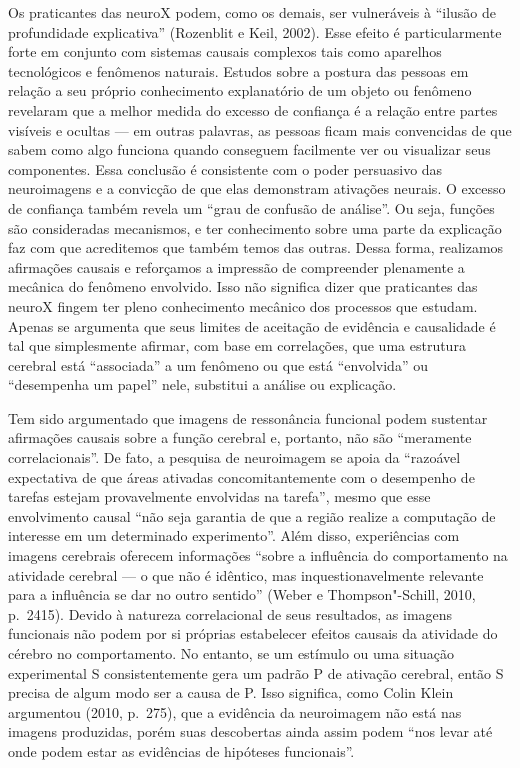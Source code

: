 Os praticantes das neuroX podem, como os demais, ser vulneráveis à
``ilusão de profundidade explicativa'' (Rozenblit e Keil, 2002). Esse
efeito é particularmente forte em conjunto com sistemas causais
complexos tais como aparelhos tecnológicos e fenômenos naturais. Estudos
sobre a postura das pessoas em relação a seu próprio conhecimento
explanatório de um objeto ou fenômeno revelaram que a melhor medida do
excesso de confiança é a relação entre partes visíveis e ocultas --- em
outras palavras, as pessoas ficam mais convencidas de que sabem como
algo funciona quando conseguem facilmente ver ou visualizar seus
componentes. Essa conclusão é consistente com o poder persuasivo das
neuroimagens e a convicção de que elas demonstram ativações neurais. O
excesso de confiança também revela um ``grau de confusão de análise''.
Ou seja, funções são consideradas mecanismos, e ter conhecimento sobre
uma parte da explicação faz com que acreditemos que também temos das
outras. Dessa forma, realizamos afirmações causais e reforçamos a
impressão de compreender plenamente a mecânica do fenômeno envolvido.
Isso não significa dizer que praticantes das neuroX fingem ter pleno
conhecimento mecânico dos processos que estudam. Apenas se argumenta que
seus limites de aceitação de evidência e causalidade é tal que
simplesmente afirmar, com base em correlações, que uma estrutura
cerebral está ``associada'' a um fenômeno ou que está ``envolvida'' ou
``desempenha um papel'' nele, substitui a análise ou explicação.

Tem sido argumentado que imagens de ressonância funcional podem
sustentar afirmações causais sobre a função cerebral e, portanto, não
são ``meramente correlacionais''. De fato, a pesquisa de neuroimagem se
apoia da ``razoável expectativa de que áreas ativadas concomitantemente
com o desempenho de tarefas estejam provavelmente envolvidas na
tarefa'', mesmo que esse envolvimento causal ``não seja garantia de que
a região realize a computação de interesse em um determinado
experimento''. Além disso, experiências com imagens cerebrais oferecem
informações ``sobre a influência do comportamento na atividade cerebral
--- o que não é idêntico, mas inquestionavelmente relevante para a
influência se dar no outro sentido'' (Weber e Thompson"-Schill, 2010,
p.~2415). Devido à natureza correlacional de seus resultados, as imagens
funcionais não podem por si próprias estabelecer efeitos causais da
atividade do cérebro no comportamento. No entanto, se um estímulo ou uma
situação experimental S consistentemente gera um padrão P de ativação
cerebral, então S precisa de algum modo ser a causa de P. Isso
significa, como Colin Klein argumentou (2010, p.~275), que a evidência da
neuroimagem não está nas imagens produzidas, porém suas descobertas
ainda assim podem ``nos levar até onde podem estar as evidências de
hipóteses funcionais''.

